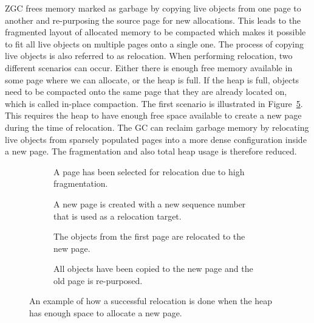 \vspace*{-0.49cm}

ZGC frees memory marked as garbage by copying live objects from one page to another and re-purposing the source page for new allocations. This leads to the fragmented layout of allocated memory to be compacted which makes it possible to fit all live objects on multiple pages onto a single one. The process of copying live objects is also referred to as relocation. When performing relocation, two different scenarios can occur. Either there is enough free memory available in some page where we can allocate, or the heap is full. If the heap is full, objects need to be compacted onto the same page that they are already located on, which is called in-place compaction. The first scenario is illustrated in Figure~\ref{fig:zrel_new}. This requires the heap to have enough free space available to create a new page during the time of relocation. The GC can reclaim garbage memory by relocating live objects from sparsely populated pages into a more dense configuration inside a new page. The fragmentation and also total heap usage is therefore reduced.

\begin{figure}[H]
    \centering
    \begin{subfigure}[t]{.2\textwidth}
        \centering
        
        \caption{A page has been selected for relocation due to high fragmentation.}
        \label{fig:zrel_new1}
    \end{subfigure}
    \hfill\vline\hfill
    \begin{subfigure}[t]{.2\textwidth}
        \centering
        
        \caption{A new page is created with a new sequence number that is used as a relocation target.}
        \label{fig:zrel_new2}
    \end{subfigure}
    \hfill\vline\hfill
    \begin{subfigure}[t]{.2\textwidth}
        \centering
        
        \caption{The objects from the first page are relocated to the new page.}
        \label{fig:zrel_new3}
    \end{subfigure}
    \hfill\vline\hfill
    \begin{subfigure}[t]{.2\textwidth}
        \centering
        
        \caption{All objects have been copied to the new page and the old page is re-purposed.}
        \label{fig:zrel_new3}
    \end{subfigure}
    \caption{An example of how a successful relocation is done when the heap has enough space to allocate a new page.}
    \label{fig:zrel_new}
\end{figure}

